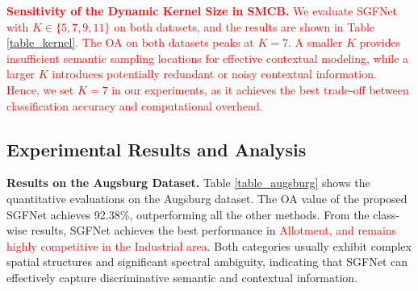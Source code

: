 \textcolor{red}{\textbf{Sensitivity of the Dynamic Kernel Size in SMCB.} We evaluate SGFNet with $K \in \{5, 7, 9, 11\}$ on both datasets, and the results are shown in Table \ref{table_kernel}. The OA on both datasets peaks at $K=7$. A smaller $K$ provides insufficient semantic sampling locations for effective contextual modeling, while a larger $K$ introduces potentially redundant or noisy contextual information. Hence, we set $K=7$ in our experiments, as it achieves the best trade-off between classification accuracy and computational overhead.}

\begin{table}[h]
  \centering
  \caption{OA (\%) of SGFNet under different dynamic kernel sizes $K$ in SMCB.}
  \label{table_kernel}
\end{table}

\subsection{Experimental Results and Analysis}

\textbf{Results on the Augsburg Dataset.} Table \ref{table_augsburg} shows the quantitative evaluations on the Augsburg dataset. The OA value of the proposed SGFNet achieves 92.38\%, outperforming all the other methods. From the class-wise results, SGFNet achieves the best performance in \textcolor{red}{Allotment, and remains highly competitive in the Industrial area.} Both categories usually exhibit complex spatial structures and significant spectral ambiguity, indicating that SGFNet can effectively capture discriminative semantic and contextual information.

